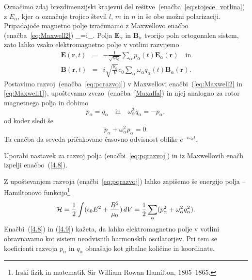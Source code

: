 Označimo zdaj brezdimenzijski krajevni del rešitve~(enačba~\ref{eq:stojece_votlina}) z 
$E_{\alpha}$, kjer $\alpha$
označuje trojico števil $l$, $m$ in $n$ in še obe možni polarizaciji. 
Pripadajoče magnetno polje izračunamo z Maxwellovo enačbo (enačba~\ref{eq:Maxwell2}) 
\beq
\nabla\times{}_{\alpha}=i\omega{}_{\alpha}.
\label{Maxalfa}
\eeq
Polja $\mathbf{E}_{\alpha}$ in $\mathbf{B}_{\alpha}$ tvorijo poln ortogonalen
sistem, zato lahko vsako elektromagnetno polje v votlini razvijemo
\begin{eqnarray}
\mathbf{E}(\mathbf{r},t) & = & -\frac{1}{\sqrt{V\epsilon_{0}}}
\sum_{\alpha}p_{\alpha}(t)\mathbf{E}_{\alpha}(\mathbf{r}) \quad \mathrm{in}\nonumber \\
\mathbf{B}(\mathbf{r},t) & = & i\sqrt{\frac{\mu_{0}}{V}}c_0\sum_{\alpha}
\omega_{\alpha}q_{\alpha}(t)\mathbf{B}_{\alpha}(\mathbf{r}).
\label{eq:pqrazvoj}
\end{eqnarray}
Postavimo razvoj~(enačba~\ref{eq:pqrazvoj}) v Maxwellovi enačbi~(\ref{eq:Maxwell2}
in \ref{eq:Maxwell1}), upoštevamo zvezo~(enačba~\ref{Maxalfa}) in njej analogno za rotor magnetnega polja
in dobimo 
\begin{equation}
p_{\alpha}=\dot{q}_{\alpha} \quad \mathrm{in} \quad 
\omega_{\alpha}^{2}q_{\alpha}=-\dot{p}_{\alpha},
\label{4.7}
\end{equation}
od koder sledi še 
\begin{equation}
\ddot{p}_{\alpha}+\omega_{\alpha}^{2}p_{\alpha}=0.
\label{4.8}
\end{equation}
Ta enačba da seveda pričakovano časovno odvisnost oblike $e^{-i \omega_\alpha t}$.

\begin{definition}
 Uporabi nastavek za razvoj polja (enačbi~\ref{eq:pqrazvoj}) in iz Maxwellovih enačb izpelji
 enačbo~(\ref{4.8}).
\end{definition}

Z upoštevanjem razvoja (enačbi~\ref{eq:pqrazvoj}) lahko zapišemo še energijo 
polja -- Hamiltonovo 
funkcijo\footnote{Irski fizik in matematik Sir William Rowan Hamilton, 1805--1865.}
\begin{equation}
{\cal H}=\frac{1}{2}\int(\epsilon_{0}E^{2}+\frac{B^{2}}{\mu_0})\, 
dV=\frac{1}{2}\sum_{\alpha}(p_{\alpha}^{2}+\omega_{\alpha}^{2}q_{\alpha}^{2}).
\label{4.9}
\end{equation}
Enačbi~(\ref{4.8}) in (\ref{4.9}) kažeta, da lahko elektromagnetno polje v votlini
obravnavamo kot sistem neodvisnih harmonskih oscilatorjev. 
Pri tem se koeficienti razvoja $p_{\alpha}$ in $q_{\alpha}$ obnašajo kot
gibalne količine in koordinate. 

